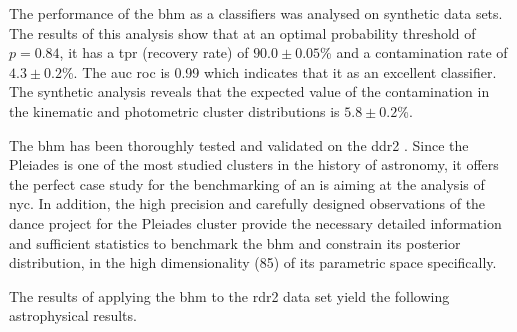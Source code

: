 The performance of the \gls{bhm} as a classifiers was analysed on synthetic data sets. The results of this analysis show that at an optimal probability threshold of $p=0.84$, it has a \acrlong{tpr} (recovery rate) of $90.0\pm0.05$\% and a contamination rate of $4.3\pm0.2$\%. The \acrlong{auc} \acrlong{roc} is 0.99 which indicates that it as an excellent classifier. The synthetic analysis reveals that the expected value of the contamination in the kinematic and photometric cluster distributions is $5.8\pm 0.2$\%.

The \gls{bhm} has been thoroughly tested and validated on the \acrlong{ddr2} \citep{Bouy2015}. Since the Pleiades is one of the most studied clusters in the history of astronomy, it offers the perfect case study for the benchmarking of an \gls{is} aiming at the analysis of \gls{nyc}. In addition, the high precision and carefully designed observations of the \gls{dance} project for the Pleiades cluster provide the necessary detailed information and sufficient statistics to benchmark the \gls{bhm} and constrain its posterior distribution, in the high dimensionality (85) of its parametric space specifically. 

The results of applying the \gls{bhm} to the \acrfull{rdr2} data set yield the following astrophysical results.

